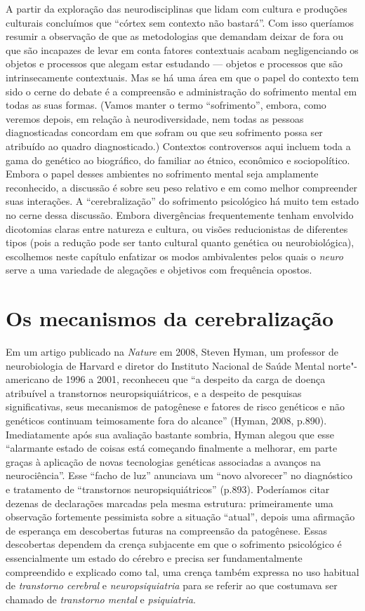 A partir da exploração das neurodisciplinas que lidam com cultura e
produções culturais concluímos que ``córtex sem contexto não bastará''.
Com isso queríamos resumir a observação de que as metodologias que
demandam deixar de fora ou que são incapazes de levar em conta fatores
contextuais acabam negligenciando os objetos e processos que alegam
estar estudando --- objetos e processos que são intrinsecamente
contextuais. Mas se há uma área em que o papel do contexto tem sido o
cerne do debate é a compreensão e administração do sofrimento mental em
todas as suas formas. (Vamos manter o termo ``sofrimento'', embora, como
veremos depois, em relação à neurodiversidade, nem todas as pessoas
diagnosticadas concordam em que sofram ou que seu sofrimento possa ser
atribuído ao quadro diagnosticado.) Contextos controversos aqui incluem
toda a gama do genético ao biográfico, do familiar ao étnico, econômico
e sociopolítico. Embora o papel desses ambientes no sofrimento mental
seja amplamente reconhecido, a discussão é sobre seu peso relativo e em
como melhor compreender suas interações. A ``cerebralização'' do
sofrimento psicológico há muito tem estado no cerne dessa discussão.
Embora divergências frequentemente tenham envolvido dicotomias claras
entre natureza e cultura, ou visões reducionistas de diferentes tipos
(pois a redução pode ser tanto cultural quanto genética ou
neurobiológica), escolhemos neste capítulo enfatizar os modos
ambivalentes pelos quais o \emph{neuro} serve a uma variedade de
alegações e objetivos com frequência opostos.

\chapter{Os mecanismos da cerebralização}

Em um artigo publicado na \emph{Nature} em 2008, Steven Hyman, um
professor de neurobiologia de Harvard e diretor do Instituto Nacional de
Saúde Mental norte"-americano de 1996 a 2001, reconheceu que ``a despeito
da carga de doença atribuível a transtornos neuropsiquiátricos, e a
despeito de pesquisas significativas, seus mecanismos de patogênese e
fatores de risco genéticos e não genéticos continuam teimosamente fora
do alcance'' (Hyman, 2008, p.890). Imediatamente após sua avaliação
bastante sombria, Hyman alegou que esse ``alarmante estado de coisas
está começando finalmente a melhorar, em parte graças à aplicação de
novas tecnologias genéticas associadas a avanços na neurociência''. Esse
``facho de luz'' anunciava um ``novo alvorecer'' no diagnóstico e
tratamento de ``transtornos neuropsiquiátricos'' (p.893). Poderíamos
citar dezenas de declarações marcadas pela mesma estrutura:
primeiramente uma observação fortemente pessimista sobre a situação
``atual'', depois uma afirmação de esperança em descobertas futuras na
compreensão da patogênese. Essas descobertas dependem da crença
subjacente em que o sofrimento psicológico é essencialmente um estado do
cérebro e precisa ser fundamentalmente compreendido e explicado como
tal, uma crença também expressa no uso habitual de \emph{transtorno
cerebral} e \emph{neuropsiquiatria} para se referir ao que costumava ser
chamado de \emph{transtorno mental} e \emph{psiquiatria}.

